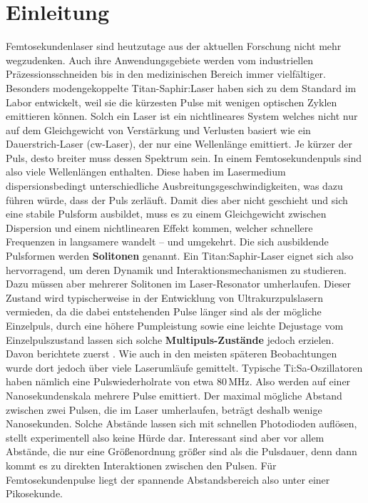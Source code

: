 \documentclass[bachelor,       %
               twoside,        %
               BCOR10mm,       %
               liststotoc,nomtotoc,bibtotoc, %
               english,ngerman, %
               final,          %
               ]{GAUBM}
\begin{document}
\mainmatter   %

\chapter{Einleitung}
Femtosekundenlaser sind heutzutage aus der aktuellen Forschung nicht mehr wegzudenken.
Auch ihre Anwendungsgebiete werden vom industriellen Präzessionsschneiden bis in den medizinischen Bereich immer vielfältiger.
Besonders modengekoppelte Titan-Saphir:Laser haben sich zu dem Standard im Labor entwickelt, weil sie die kürzesten Pulse mit wenigen optischen Zyklen emittieren können.
Solch ein Laser ist ein nichtlineares System welches nicht nur auf dem Gleichgewicht von Verstärkung und Verlusten basiert wie ein Dauerstrich-Laser (cw-Laser), der nur eine Wellenlänge emittiert.
Je kürzer der Puls, desto breiter muss dessen Spektrum sein.
In einem Femtosekundenpuls sind also viele Wellenlängen enthalten.
Diese haben im Lasermedium dispersionsbedingt unterschiedliche Ausbreitungsgeschwindigkeiten, was dazu führen würde, dass der Puls zerläuft.
Damit dies aber nicht geschieht und sich eine stabile Pulsform ausbildet, muss es zu  einem Gleichgewicht zwischen Dispersion und einem nichtlinearen Effekt kommen, welcher schnellere Frequenzen in langsamere wandelt -- und umgekehrt.
Die sich ausbildende Pulsformen werden \textbf{Solitonen} genannt.
Ein Titan:Saphir-Laser eignet sich also hervorragend, um deren Dynamik und Interaktionsmechanismen zu studieren.
Dazu müssen aber mehrerer Solitonen im Laser-Resonator umherlaufen.
Dieser Zustand wird typischerweise in der Entwicklung von Ultrakurzpulslasern vermieden, da die dabei entstehenden Pulse länger sind als der mögliche Einzelpuls, durch eine höhere Pumpleistung sowie eine leichte Dejustage vom Einzelpulszustand lassen sich solche \textbf{Multipuls-Zustände} jedoch erzielen.
Davon berichtete zuerst \cite{lai_multiple_1997}.
Wie auch in den meisten späteren Beobachtungen wurde dort jedoch über viele Laserumläufe gemittelt.
Typische Ti:Sa-Oszillatoren haben nämlich eine Pulswiederholrate von etwa 80\,MHz.
Also werden auf einer Nanosekundenskala mehrere Pulse emittiert.
Der maximal mögliche Abstand zwischen zwei Pulsen, die im Laser umherlaufen, beträgt deshalb wenige Nanosekunden.
Solche Abstände lassen sich mit schnellen Photodioden auflösen, stellt experimentell also keine Hürde dar.
Interessant sind aber vor allem Abstände, die nur eine Größenordnung größer sind als die Pulsdauer, denn dann kommt es zu direkten Interaktionen zwischen den Pulsen.
Für Femtosekundenpulse liegt der spannende Abstandsbereich also unter einer Pikosekunde.
\end{document}
